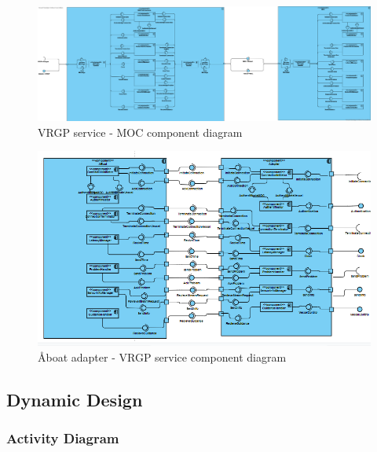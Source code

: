 \begin{landscape}

\begin{figure}[!p]
	\centering
	\includegraphics[width=\linewidth]{diagrams/ComponentDiagram_GenericVrgpMicroservice_HandlerView}
	\caption{VRGP service - MOC component diagram}
	\label{fig:vrgp-moc-component-diagram}
\end{figure}

\end{landscape}

\begin{landscape}

\begin{figure}[!p]
	\centering
	\includegraphics[width=\linewidth]{diagrams/components_adapter}
	\caption{Åboat adapter - VRGP service component diagram}
	\label{fig:adapter-vrgp-component-diagram}
\end{figure}

\end{landscape}

\subsection{Dynamic Design}\label{sec:dynamic-design}

\subsubsection{Activity Diagram}


